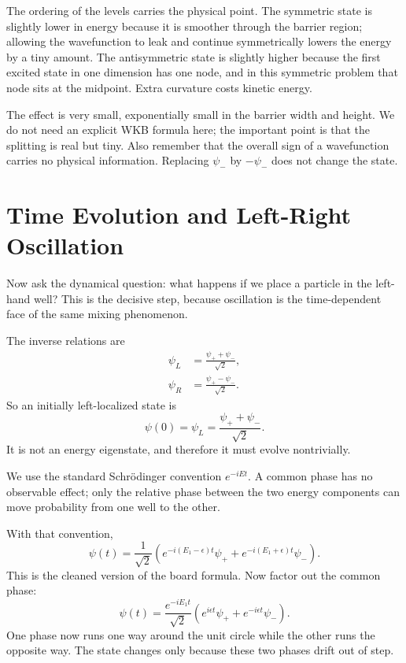 The ordering of the levels carries the physical point. The symmetric state is slightly lower in energy because it is smoother through the barrier region; allowing the wavefunction to leak and continue symmetrically lowers the energy by a tiny amount. The antisymmetric state is slightly higher because the first excited state in one dimension has one node, and in this symmetric problem that node sits at the midpoint. Extra curvature costs kinetic energy.

The effect is very small, exponentially small in the barrier width and height. We do not need an explicit WKB formula here; the important point is that the splitting is real but tiny. Also remember that the overall sign of a wavefunction carries no physical information. Replacing \(\psi_-\) by \(-\psi_-\) does not change the state.

\section{Time Evolution and Left-Right Oscillation}

Now ask the dynamical question: what happens if we place a particle in the left-hand well? This is the decisive step, because oscillation is the time-dependent face of the same mixing phenomenon.

The inverse relations are
\begin{align}
\psi_L &= \frac{\psi_+ + \psi_-}{\sqrt{2}},\\
\psi_R &= \frac{\psi_+ - \psi_-}{\sqrt{2}}.
\end{align}
So an initially left-localized state is
\begin{equation}
\psi(0)=\psi_L=\frac{\psi_+ + \psi_-}{\sqrt{2}}.
\end{equation}
It is not an energy eigenstate, and therefore it must evolve nontrivially.

We use the standard Schr\"odinger convention \(e^{-iEt}\). A common phase has no observable effect; only the relative phase between the two energy components can move probability from one well to the other.

With that convention,
\begin{equation}
\psi(t)=\frac{1}{\sqrt{2}}\left(e^{-i(E_1-\epsilon)t}\psi_+ + e^{-i(E_1+\epsilon)t}\psi_-\right).
\end{equation}
This is the cleaned version of the board formula. Now factor out the common phase:
\begin{equation}
\psi(t)=\frac{e^{-iE_1 t}}{\sqrt{2}}\left(e^{i\epsilon t}\psi_+ + e^{-i\epsilon t}\psi_-\right).
\end{equation}
One phase now runs one way around the unit circle while the other runs the opposite way. The state changes only because these two phases drift out of step.

